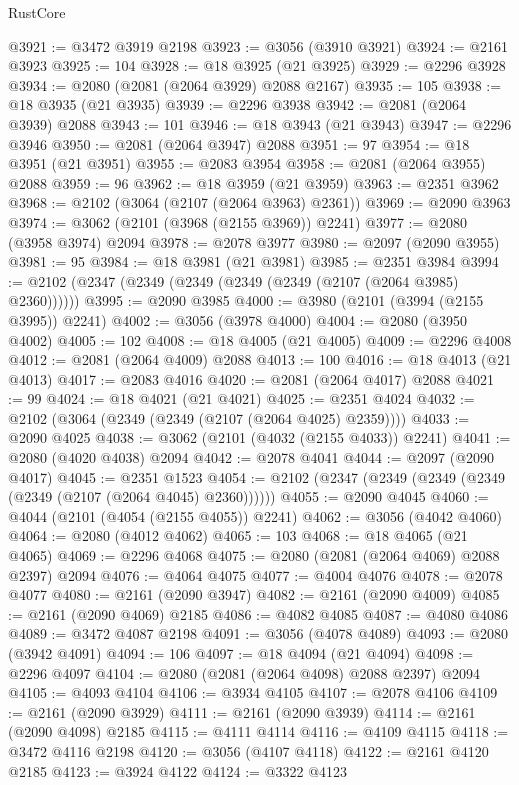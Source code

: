 \begin{lexlean}{RustCore}
\begin{coremodule}
@3921 := @3472 @3919 @2198
@3923 := @3056 (@3910 @3921)
@3924 := @2161 @3923
@3925 := 104
@3928 := @18 @3925 (@21 @3925)
@3929 := @2296 @3928
@3934 := @2080 (@2081 (@2064 @3929) @2088 @2167)
@3935 := 105
@3938 := @18 @3935 (@21 @3935)
@3939 := @2296 @3938
@3942 := @2081 (@2064 @3939) @2088
@3943 := 101
@3946 := @18 @3943 (@21 @3943)
@3947 := @2296 @3946
@3950 := @2081 (@2064 @3947) @2088
@3951 := 97
@3954 := @18 @3951 (@21 @3951)
@3955 := @2083 @3954
@3958 := @2081 (@2064 @3955) @2088
@3959 := 96
@3962 := @18 @3959 (@21 @3959)
@3963 := @2351 @3962
@3968 := @2102 (@3064 (@2107 (@2064 @3963) @2361))
@3969 := @2090 @3963
@3974 := @3062 (@2101 (@3968 (@2155 @3969)) @2241)
@3977 := @2080 (@3958 @3974) @2094
@3978 := @2078 @3977
@3980 := @2097 (@2090 @3955)
@3981 := 95
@3984 := @18 @3981 (@21 @3981)
@3985 := @2351 @3984
@3994 := @2102 (@2347 (@2349 (@2349 (@2349 (@2349 (@2107 (@2064 @3985) @2360))))))
@3995 := @2090 @3985
@4000 := @3980 (@2101 (@3994 (@2155 @3995)) @2241)
@4002 := @3056 (@3978 @4000)
@4004 := @2080 (@3950 @4002)
@4005 := 102
@4008 := @18 @4005 (@21 @4005)
@4009 := @2296 @4008
@4012 := @2081 (@2064 @4009) @2088
@4013 := 100
@4016 := @18 @4013 (@21 @4013)
@4017 := @2083 @4016
@4020 := @2081 (@2064 @4017) @2088
@4021 := 99
@4024 := @18 @4021 (@21 @4021)
@4025 := @2351 @4024
@4032 := @2102 (@3064 (@2349 (@2349 (@2107 (@2064 @4025) @2359))))
@4033 := @2090 @4025
@4038 := @3062 (@2101 (@4032 (@2155 @4033)) @2241)
@4041 := @2080 (@4020 @4038) @2094
@4042 := @2078 @4041
@4044 := @2097 (@2090 @4017)
@4045 := @2351 @1523
@4054 := @2102 (@2347 (@2349 (@2349 (@2349 (@2349 (@2107 (@2064 @4045) @2360))))))
@4055 := @2090 @4045
@4060 := @4044 (@2101 (@4054 (@2155 @4055)) @2241)
@4062 := @3056 (@4042 @4060)
@4064 := @2080 (@4012 @4062)
@4065 := 103
@4068 := @18 @4065 (@21 @4065)
@4069 := @2296 @4068
@4075 := @2080 (@2081 (@2064 @4069) @2088 @2397) @2094
@4076 := @4064 @4075
@4077 := @4004 @4076
@4078 := @2078 @4077
@4080 := @2161 (@2090 @3947)
@4082 := @2161 (@2090 @4009)
@4085 := @2161 (@2090 @4069) @2185
@4086 := @4082 @4085
@4087 := @4080 @4086
@4089 := @3472 @4087 @2198
@4091 := @3056 (@4078 @4089)
@4093 := @2080 (@3942 @4091)
@4094 := 106
@4097 := @18 @4094 (@21 @4094)
@4098 := @2296 @4097
@4104 := @2080 (@2081 (@2064 @4098) @2088 @2397) @2094
@4105 := @4093 @4104
@4106 := @3934 @4105
@4107 := @2078 @4106
@4109 := @2161 (@2090 @3929)
@4111 := @2161 (@2090 @3939)
@4114 := @2161 (@2090 @4098) @2185
@4115 := @4111 @4114
@4116 := @4109 @4115
@4118 := @3472 @4116 @2198
@4120 := @3056 (@4107 @4118)
@4122 := @2161 @4120 @2185
@4123 := @3924 @4122
@4124 := @3322 @4123

\end{coremodule}
\end{lexlean}
